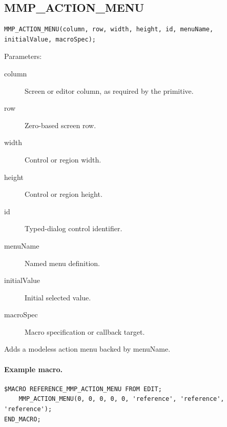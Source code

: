 \documentclass[a4paper,10pt,twoside,openany]{book}
\newenvironment{mrmacextension}{\begin{changebar}}{\end{changebar}}
\begin{document}
\begin{mrmacextension}
\label{prim:procedure-mmp-action-menu}
\subsection*{MMP\_ACTION\_MENU}
\begin{verbatim}
MMP_ACTION_MENU(column, row, width, height, id, menuName, initialValue, macroSpec);
\end{verbatim}
Parameters:
\begin{description}
\item[column] Screen or editor column, as required by the primitive.
\item[row] Zero-based screen row.
\item[width] Control or region width.
\item[height] Control or region height.
\item[id] Typed-dialog control identifier.
\item[menuName] Named menu definition.
\item[initialValue] Initial selected value.
\item[macroSpec] Macro specification or callback target.
\end{description}

Adds a modeless action menu backed by menuName.

\paragraph{Example macro.}
\begin{verbatim}
$MACRO REFERENCE_MMP_ACTION_MENU FROM EDIT;
    MMP_ACTION_MENU(0, 0, 0, 0, 0, 'reference', 'reference', 'reference');
END_MACRO;
\end{verbatim}
\end{mrmacextension}
\end{document}
